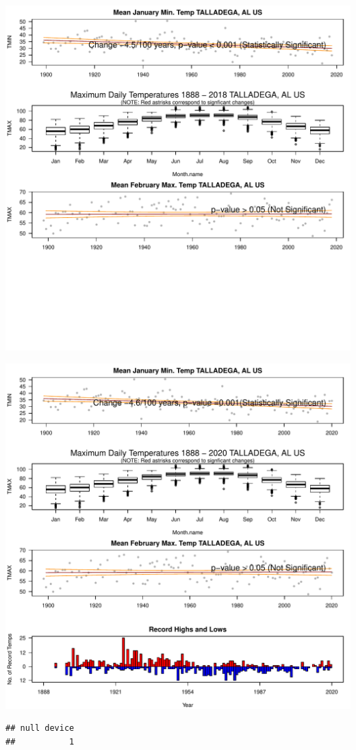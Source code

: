 \documentclass{article}\usepackage[]{graphicx}\usepackage[]{color}
\makeatletter
\def\maxwidth{ %
  \ifdim\Gin@nat@width>\linewidth
    \linewidth
  \else
    \Gin@nat@width
  \fi
}
\newenvironment{kframe}{%
 \def\at@end@of@kframe{}%
 \ifinner\ifhmode%
  \def\at@end@of@kframe{\end{minipage}}%
  \begin{minipage}{\columnwidth}%
 \fi\fi%
 \def\FrameCommand##1{\hskip\@totalleftmargin \hskip-\fboxsep
 \colorbox{shadecolor}{##1}\hskip-\fboxsep
     \hskip-\linewidth \hskip-\@totalleftmargin \hskip\columnwidth}%
 \MakeFramed {\advance\hsize-\width
   \@totalleftmargin\z@ \linewidth\hsize
   \@setminipage}}%
 {\par\unskip\endMakeFramed%
 \at@end@of@kframe}
\newenvironment{knitrout}{}{} %
\makeatother
\begin{document}
\begin{knitrout}
\includegraphics[width=\maxwidth]{figure/static_template-55} 

\includegraphics[width=\maxwidth]{figure/static_template-56} 
\begin{kframe}\begin{verbatim}
## null device 
##           1
\end{verbatim}
\end{kframe}
\end{knitrout}
\end{document}
